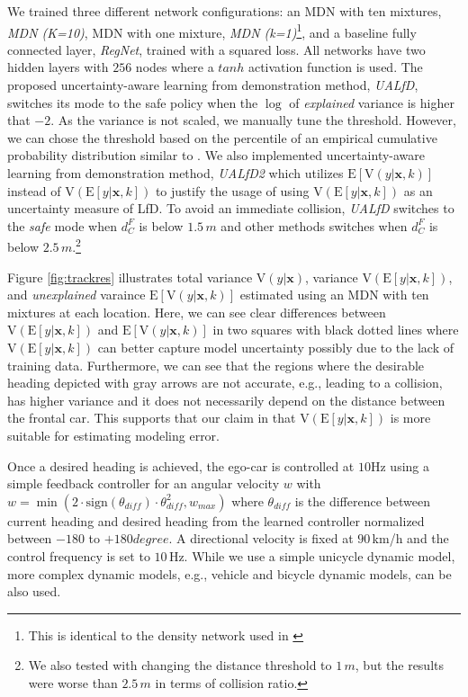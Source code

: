 \documentclass[letterpaper, 10 pt, conference]{ieeeconf}  %
\def\Bx{\mathbf{x}} \def\By{\mathbf{y}} \def\Bp{\mathbf{p}}
\begin{document}
We trained three different network configurations:
an MDN with ten mixtures, \textit{MDN (K=10)},
MDN with one mixture, \textit{MDN (k=1)}\footnote{
This is identical to the density network used in
\cite{Kendall_17, Lakshminarayanan_16}
},
and a baseline fully connected layer, \textit{RegNet}, 
trained with a squared loss. 
All networks have two hidden layers with $256$ nodes
where a $tanh$ activation function is used. 
The proposed 
uncertainty-aware learning from demonstration method, \textit{UALfD},
switches its mode to the safe policy when the
$\log$ of \textit{explained} variance is higher that $-2$. 
As the variance is not scaled, we manually tune the threshold. 
However, we can chose the threshold based on the 
percentile of an empirical cumulative probability distribution
similar to \cite{Richter_17}. 
We also implemented uncertainty-aware learning from 
demonstration method, \textit{UALfD2}
which utilizes $\mathrm{E}[\mathrm{V}(y|\Bx, k)]$
instead of 
$\mathrm{V}(\mathrm{E}[y|\Bx, k])$
to justify the usage of using 
$\mathrm{V}(\mathrm{E}[y|\Bx, k])$
as an uncertainty measure of LfD. 
To avoid an immediate collision, \textit{UALfD} switches to 
the \textit{safe} mode when $d^F_C$ is below $1.5\,m$
and other methods switches when 
$d^F_C$ is below $2.5\,m$.\footnote{
We also tested with changing the distance threshold to $1\,m$,
but the results were worse than $2.5\,m$ in terms of collision ratio. 
}

Figure \ref{fig:trackres} illustrates 
total variance 
$\mathrm{V}(y | \Bx)$, 
 variance 
$\mathrm{V}(\mathrm{E}[y|\Bx, k])$, and
\textit{unexplained} varaince
$\mathrm{E}[\mathrm{V}(y|\Bx, k)]$
estimated using an MDN with ten mixtures
at each location. 
Here, we can see clear differences between 
$\mathrm{V}(\mathrm{E}[y|\Bx, k])$
and 
$\mathrm{E}[\mathrm{V}(y|\Bx, k)]$
in two squares with black dotted lines
where $\mathrm{V}(\mathrm{E}[y|\Bx, k])$
can better capture model uncertainty 
possibly due to the lack of training data. 
Furthermore, we can see that the regions 
where the desirable heading depicted with gray arrows
are not accurate, e.g., leading to a collision, has
higher variance and it does not necessarily depend on the 
distance between the frontal car. 
This supports that our claim in that
$\mathrm{V}(\mathrm{E}[y|\Bx, k])$
is more suitable for estimating modeling error. 


Once a desired heading is achieved, 
the ego-car is controlled at $10$Hz using a simple feedback controller
for an angular velocity $w$ with 
$w = \min(2 \cdot \text{sign}(\theta_{diff}) \cdot \theta_{diff}^2, w_{max}) $
where $\theta_{diff}$ is the difference between current heading
and desired heading from the learned controller
normalized between $-180$ to $+180 degree$.
A directional velocity is fixed at $90\,$km/h and the control
frequency is set to $10\,$Hz. 
While we use a simple unicycle dynamic model, more complex dynamic 
models, e.g., vehicle and bicycle dynamic models, can be also used. 
\end{document}
